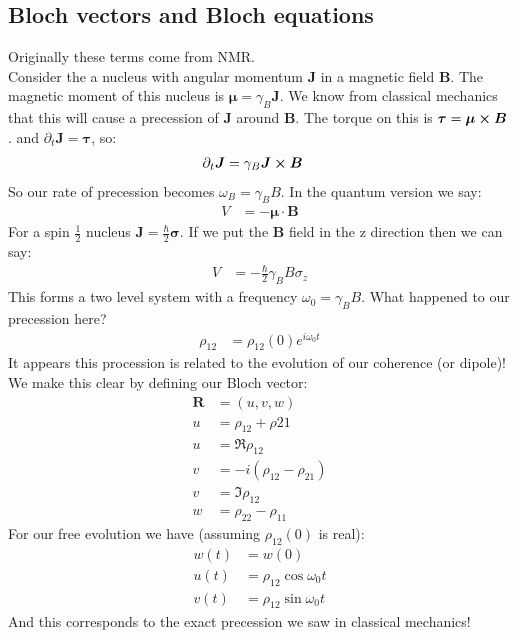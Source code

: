 \subsection{Bloch vectors and Bloch equations}
Originally these terms come from NMR.\\
Consider the a nucleus with angular momentum $\bm{J}$ in a magnetic field $\bm{B}$. The magnetic moment of this nucleus is $\bm{\mu} = \gamma_B \bm{J}$. We know from classical mechanics that this will cause a precession of $\bm{J}$ around $\bm{B}$.
The torque on this is $\bm{\tau} = \bm{\mu}\cross\bm{B}$. and $\partial_t \bm{J} = \bm{\tau}$, so:
\begin{align*}
	\partial_t \bm{J} &= \gamma_B \bm{J}\cross\bm{B}
\end{align*}
So our rate of precession becomes $\omega_B = \gamma_B B$. In the quantum version we say:
\begin{align*}
	V &= -\bm{\mu}\cdot\bm{B}
\end{align*}
For a spin $\frac{1}{2}$ nucleus $\bm{J} = \frac{\hbar}{2}\bm{\sigma}$. If we put the $\bm{B}$ field in the z direction then we can say:
\begin{align*}
	V &= -\frac{\hbar}{2}\gamma_B B \sigma_z
\end{align*}
This forms a two level system with a frequency $\omega_0 = \gamma_B B$. What happened to our precession here?
\begin{align*}
	\rho_{12} &= \rho_{12}(0) e^{i\omega_0 t}
\end{align*}
It appears this procession is related to the evolution of our coherence (or dipole)! \\
We make this clear by defining our Bloch vector:
\begin{align*}
	\bm{R} &= (u,v,w) \\
	u &= \rho_{12} + \rho{21} \\
	u &= \Re \rho_{12} \\
	v &= -i(\rho_{12} -\rho_{21}) \\
	v &= \Im\rho_{12} \\
	w &= \rho_{22} - \rho_{11}
\end{align*}
For our free evolution we have (assuming $\rho_{12}(0)$ is real):
\begin{align*}
	w(t) &= w(0) \\
	u(t) &= \rho_{12} \cos\omega_0 t \\
	v(t) &= \rho_{12} \sin\omega_0 t
\end{align*}
And this corresponds to the exact precession we saw in classical mechanics! \\
